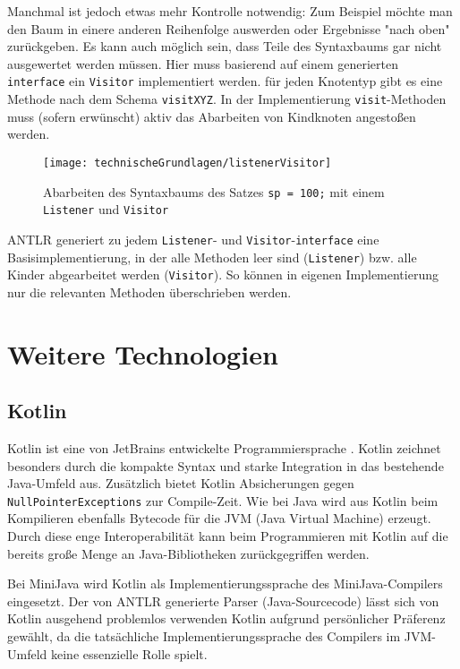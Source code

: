 Manchmal ist jedoch etwas mehr Kontrolle notwendig: Zum Beispiel möchte man den Baum in einere anderen Reihenfolge auswerden oder Ergebnisse "nach oben" zurückgeben. Es kann auch möglich sein, dass Teile des Syntaxbaums gar nicht ausgewertet werden müssen. Hier muss basierend auf einem generierten \lstinline{interface} ein \lstinline{Visitor} implementiert werden. für jeden Knotentyp gibt es eine Methode nach dem Schema \lstinline{visitXYZ}. In der Implementierung \lstinline{visit}-Methoden muss (sofern erwünscht) aktiv das Abarbeiten von Kindknoten angestoßen werden.

\begin{figure}[]
    \centering
    \texttt{[image: technischeGrundlagen/listenerVisitor]}
    \caption{Abarbeiten des Syntaxbaums des Satzes \lstinline{sp = 100;} mit einem \lstinline{Listener} und \lstinline{Visitor} \cite{ANTLR4Reference}}
    \label{fig:listenerVisitor}
\end{figure}

ANTLR generiert zu jedem \lstinline{Listener}- und \lstinline{Visitor}-\lstinline{interface} eine Basisimplementierung, in der alle Methoden leer sind (\lstinline{Listener}) bzw. alle Kinder abgearbeitet werden (\lstinline{Visitor}). So können in eigenen Implementierung nur die relevanten Methoden überschrieben werden.

\section{Weitere Technologien}
\subsection{Kotlin}
Kotlin ist eine von JetBrains entwickelte Programmiersprache \cite{KotlinReference}. Kotlin zeichnet besonders durch die kompakte Syntax und starke Integration in das bestehende Java-Umfeld aus. Zusätzlich bietet Kotlin Absicherungen gegen \lstinline{NullPointerExceptions} zur Compile-Zeit. Wie bei Java wird aus Kotlin beim Kompilieren ebenfalls Bytecode für die JVM (Java Virtual Machine) erzeugt. Durch diese enge Interoperabilität kann beim Programmieren mit Kotlin auf die bereits große Menge an Java-Bibliotheken zurückgegriffen werden.

Bei MiniJava wird Kotlin als Implementierungssprache des MiniJava-Compilers eingesetzt. Der von ANTLR generierte Parser (Java-Sourcecode) lässt sich von Kotlin ausgehend problemlos verwenden Kotlin aufgrund persönlicher Präferenz gewählt, da die tatsächliche Implementierungssprache des Compilers im JVM-Umfeld keine essenzielle Rolle spielt.

